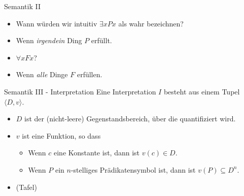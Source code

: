 \documentclass[12pt]{beamer}
\begin{document}
\begin{frame}{Semantik II}
  \begin{itemize}[<+->]
  \item Wann würden wir intuitiv $\exists x Px$ als wahr bezeichnen?
  \item Wenn \emph{irgendein} Ding $P$ erfüllt.
  \item $\forall x Fx$?
  \item Wenn \emph{alle} Dinge $F$ erfüllen.
  \end{itemize}
\end{frame}

\begin{frame}{Semantik III - Interpretation}
  Eine Interpretation $I$ besteht aus einem Tupel
  $\langle D,v\rangle$.
  \begin{itemize}[<+->]
  \item $D$ ist der (nicht-leere) Gegenstandsbereich, über die
    quantifiziert wird.
  
  \item $v$ ist eine Funktion, so dass
    \begin{itemize}
    \item Wenn $c$ eine Konstante ist, dann ist $v(c) \in D$.
    \item Wenn $P$ ein $n$-stelliges Prädikatensymbol ist, dann ist
      $v(P) \subseteq D^n$.
    \end{itemize}
  \item (Tafel)
  \end{itemize}

\end{frame}
\end{document}
